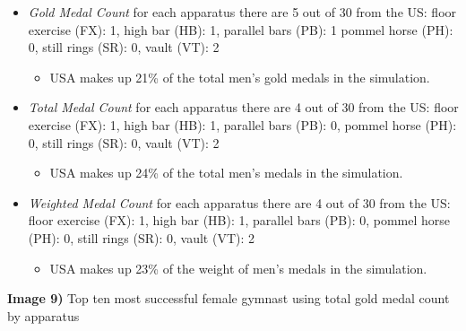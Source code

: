 \documentclass[
  10.5pt,
  letterpaper,
  DIV=11,
  numbers=noendperiod]{scrartcl}
\providecommand{\tightlist}{%
  \setlength{\itemsep}{0pt}\setlength{\parskip}{0pt}}\usepackage{longtable,booktabs,array}
\begin{document}
\begin{itemize}
\item
  \emph{Gold Medal Count} for each apparatus there are 5 out of 30 from
  the US: floor exercise (FX): 1, high bar (HB): 1, parallel bars (PB):
  1 pommel horse (PH): 0, still rings (SR): 0, vault (VT): 2

  \begin{itemize}
  \tightlist
  \item
    USA makes up 21\% of the total men's gold medals in the simulation.
  \end{itemize}
\item
  \emph{Total Medal Count} for each apparatus there are 4 out of 30 from
  the US: floor exercise (FX): 1, high bar (HB): 1, parallel bars (PB):
  0, pommel horse (PH): 0, still rings (SR): 0, vault (VT): 2

  \begin{itemize}
  \tightlist
  \item
    USA makes up 24\% of the total men's medals in the simulation.
  \end{itemize}
\item
  \emph{Weighted Medal Count} for each apparatus there are 4 out of 30
  from the US: floor exercise (FX): 1, high bar (HB): 1, parallel bars
  (PB): 0, pommel horse (PH): 0, still rings (SR): 0, vault (VT): 2

  \begin{itemize}
  \tightlist
  \item
    USA makes up 23\% of the weight of men's medals in the simulation.
  \end{itemize}
\end{itemize}

\textbf{Image 9)} Top ten most successful female gymnast using total
gold medal count by apparatus
\end{document}
